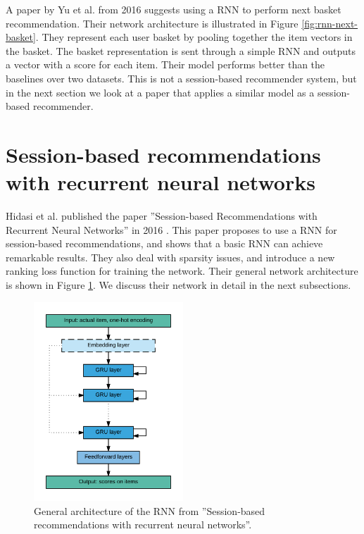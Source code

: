 A paper by Yu et al. from 2016 \cite{Yu:2016:DRM:2911451.2914683} suggests using a RNN to perform next basket recommendation. Their network architecture is illustrated in Figure \ref{fig:rnn-next-basket}. They represent each user basket by pooling together the item vectors in the basket. The basket representation is sent through a simple RNN and outputs a vector with a score for each item. Their model performs better than the baselines over two datasets. This is not a session-based recommender system, but in the next section we look at a paper that applies a similar model as a session-based recommender.


\section{Session-based recommendations with recurrent neural networks}
\label{sec:hidasi-sess-based-rnn}
Hidasi et al. published the paper ''Session-based Recommendations with Recurrent Neural Networks'' in 2016 \cite{DBLP:journals/corr/HidasiKBT15}. This paper proposes to use a RNN for session-based recommendations, and shows that a basic RNN can achieve remarkable results. They also deal with sparsity issues, and introduce a new ranking loss function for training the network. Their general network architecture is shown in Figure \ref{fig:gru4rec-network}. We discuss their network in detail in the next subsections.

\begin{figure}[htp]
	\centering
	\includegraphics[width=0.5\textwidth]{fig/gru4rec-network.png}
	\caption{General architecture of the RNN from ''Session-based recommendations with recurrent neural networks''. \cite{DBLP:journals/corr/HidasiKBT15}}
	\label{fig:gru4rec-network}
\end{figure}

